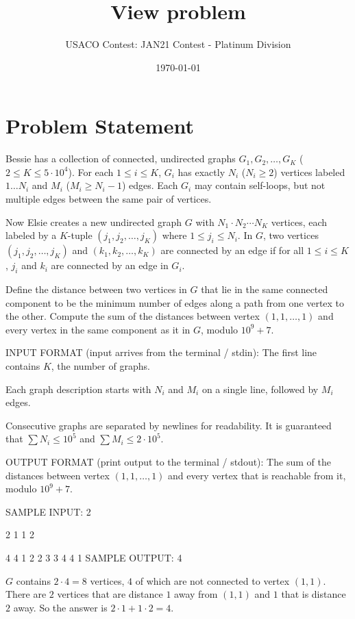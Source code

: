 \documentclass[12pt]{article}
\title{View problem}
\author{USACO Contest: JAN21 Contest - Platinum Division}
\date{\today}
\begin{document}
\maketitle

\section*{Problem Statement}

Bessie has a collection of connected, undirected graphs $G_1,G_2,\ldots,G_K$
($2\le K\le 5\cdot 10^4$). For each  $1\le i\le K$, $G_i$ has exactly $N_i$
($N_i\ge 2$) vertices labeled $1\ldots N_i$ and $M_i$ ($M_i\ge N_i-1$) edges.
Each $G_i$ may contain self-loops, but not multiple edges between the same pair
of vertices.

Now Elsie creates a new undirected graph $G$ with $N_1\cdot N_2\cdots N_K$
vertices, each labeled by a $K$-tuple $(j_1,j_2,\ldots,j_K)$ where
$1\le j_i\le N_i$. In $G$, two vertices $(j_1,j_2,\ldots,j_K)$ and
$(k_1,k_2,\ldots,k_K)$ are connected by an edge if for all $1\le i\le K$, $j_i$
and $k_i$ are connected by an edge in
$G_i$.

Define the distance between two vertices in $G$ that lie in the same
connected  component to be the minimum number of edges along a path from one
vertex to the other. Compute the sum of the distances between vertex
$(1,1,\ldots,1)$ and every vertex in the same component as it in $G$, modulo
$10^9+7$.

INPUT FORMAT (input arrives from the terminal / stdin):
The first line contains $K$, the number of graphs.

Each graph description starts with $N_i$ and $M_i$ on a single line, followed by
$M_i$ edges.

Consecutive graphs are separated by newlines for readability. It is guaranteed
that $\sum N_i\le 10^5$ and $\sum M_i\le 2\cdot 10^5$.

OUTPUT FORMAT (print output to the terminal / stdout):
The sum of the distances between vertex $(1,1,\ldots,1)$ and every vertex that
is reachable from it, modulo $10^9+7$.

SAMPLE INPUT:
2

2 1
1 2

4 4
1 2
2 3
3 4
4 1
SAMPLE OUTPUT: 
4

$G$ contains $2\cdot 4=8$ vertices, $4$ of which are not connected to vertex
$(1,1)$.  There are $2$ vertices that are distance $1$ away from $(1,1)$ and $1$
that is distance $2$ away. So the answer is $2\cdot 1+1\cdot 2=4$.
\end{document}
